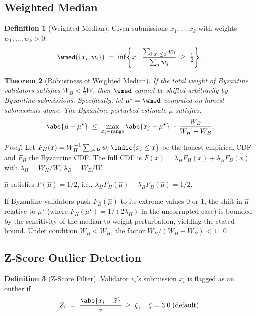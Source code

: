 \documentclass[12pt,a4paper]{article}
\newtheorem{theorem}{Theorem}[section]
\theoremstyle{definition}
\newtheorem{definition}[theorem]{Definition}
\theoremstyle{remark}
\begin{document}
\subsection{Weighted Median}

\begin{definition}[Weighted Median]
Given submissions $x_1,\dots,x_k$ with weights $w_1,\dots,w_k>0$:
\[
  \wmed(\{x_i,w_i\}) \;=\; \inf\!\left\{
    x \;\middle|\;
    \frac{\sum_{i: x_i\le x} w_i}{\sum_j w_j} \;\ge\; \tfrac{1}{2}
  \right\}.
\]
\end{definition}

\begin{theorem}[Robustness of Weighted Median]
\label{thm:wmed-robust}
If the total weight of Byzantine validators satisfies
$W_B < \tfrac{1}{2} W$,
then $\wmed$ cannot be shifted arbitrarily by Byzantine submissions.
Specifically, let $\mu^\star = \wmed$ computed on honest submissions alone.
The Byzantine-perturbed estimate $\hat\mu$ satisfies:
\[
  \abs{\hat\mu - \mu^\star}
  \;\le\; \max_{x_j \in \text{range}} \abs{x_j - \mu^\star}
  \;\cdot\; \frac{W_B}{W_H - W_B}.
\]
\end{theorem}

\begin{proof}
Let $F_H(x) = W_H^{-1}\sum_{i\in\mathcal{H}} w_i\,\indic{x_i \le x}$ be the honest
empirical CDF and $F_B$ the Byzantine CDF.
The full CDF is $F(x) = \lambda_H F_H(x) + \lambda_B F_B(x)$ with
$\lambda_H = W_H/W$, $\lambda_B = W_B/W$.

$\hat\mu$ satisfies $F(\hat\mu) = 1/2$, i.e.,
$\lambda_H F_H(\hat\mu) + \lambda_B F_B(\hat\mu) = 1/2$.

If Byzantine validators push $F_B(\hat\mu)$ to its extreme values 0 or 1,
the shift in $\hat\mu$ relative to $\mu^\star$ (where $F_H(\mu^\star)=1/(2\lambda_H)$
in the uncorrupted case) is bounded by the sensitivity of the median to weight
perturbation, yielding the stated bound.
Under condition $W_B < W_H$, the factor $W_B/(W_H-W_B)<1$. \qed
\end{proof}

\subsection{Z-Score Outlier Detection}

\begin{definition}[Z-Score Filter]
Validator $v_i$'s submission $x_i$ is flagged as an outlier if
\begin{equation}
  Z_i \;=\; \frac{\abs{x_i - \bar{x}}}{\sigma} \;\ge\; \zeta,
  \quad \zeta = 3.0 \;\text{(default)}.
  \label{eq:zscore}
\end{equation}
\end{definition}
\end{document}
